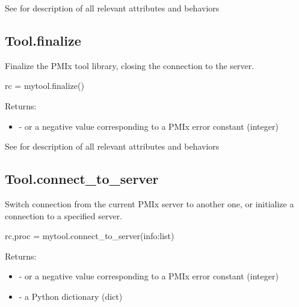 See  for description of all relevant attributes and behaviors


\subsection{Tool.finalize}

\summary Finalize the PMIx tool library, closing the connection to the server.

\format

\pyspecificstart
\begin{codepar}
rc = mytool.finalize()
\end{codepar}
\pyspecificend


Returns:

\begin{itemize}
    \item {} -  or a negative value corresponding to a PMIx error constant (integer)
\end{itemize}


See  for description of all relevant attributes and behaviors


\subsection{Tool.connect_to_server}

\summary
Switch connection from the current \ac{PMIx} server to another one, or initialize a connection to a specified server.


\format

\pyspecificstart
\begin{codepar}
rc,proc = mytool.connect_to_server(info:list)
\end{codepar}
\pyspecificend


\begin{arglist}
\end{arglist}

Returns:

\begin{itemize}
    \item {} -  or a negative value corresponding to a PMIx error constant (integer)
    \item {} - a Python  dictionary (dict)
\end{itemize}


